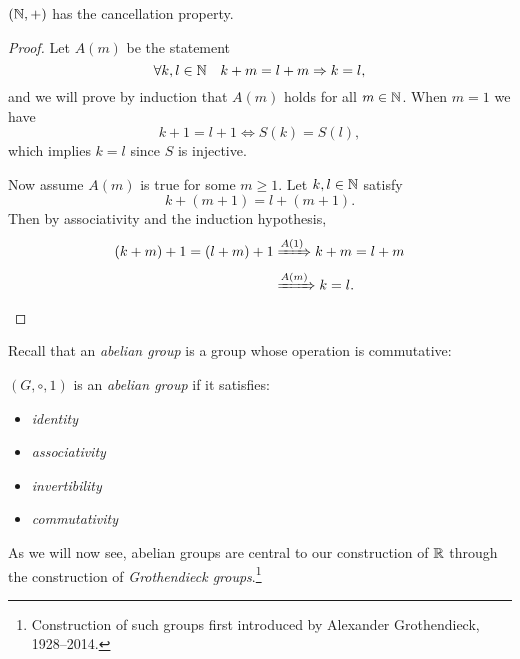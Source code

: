 \documentclass[master.tex]{subfiles}
\begin{document}
    \begin{lemma}[label=n-additive-cancellation]
        $(\mathbb{N}, +)$ has the cancellation property.
        \tcblower
        \begin{proof}
            Let $A(m)$ be the statement
            \[
                \forall k, l \in \mathbb{N} \quad k + m = l + m \Rightarrow k = l
            ,\]
            and we will prove by induction that $A(m)$ holds for all $m \in \mathbb{N}$.
            When $m = 1$ we have
            \[
                k + 1 = l + 1 \iff S(k) = S(l)  
            ,\]
            which implies $k = l$ since $S$ is injective.

            Now assume $A(m)$ is true for some $m \geq 1$.
            Let $k, l \in \mathbb{N}$ satisfy
            \[
                k + (m + 1) = l + (m + 1)
            .\]
            Then by associativity and the induction hypothesis,
            \begin{align*}
                (k + m) + 1 = (l + m) + 1 &\xRightarrow{A(1)} k + m = l + m \\
                &\xRightarrow{A(m)} k = l.
            \end{align*}
        \end{proof}
    \end{lemma}

    Recall that an \emph{abelian group} is a group whose operation is commutative:
    \begin{definition}[title=Abelian group, label=abelian-group]
        $(G, \circ, 1)$ is an \emph{abelian group} if it satisfies:
        \begin{itemize}
            \item {} \emph{identity}
            \item {} \emph{associativity}
            \item {} \emph{invertibility}
            \item {} \emph{commutativity}
        \end{itemize}
    \end{definition}
    As we will now see, abelian groups are central to our construction of $\mathbb{R}$ through the construction of \emph{Grothendieck groups}.\footnote{
        Construction of such groups first introduced by Alexander Grothendieck, 1928--2014.
    }
\end{document}
